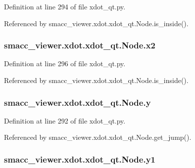 Definition at line 294 of file xdot\+\_\+qt.\+py.



Referenced by smacc\+\_\+viewer.\+xdot.\+xdot\+\_\+qt.\+Node.\+is\+\_\+inside().

\subsubsection[{\texorpdfstring{x2}{x2}}]{\setlength{\rightskip}{0pt plus 5cm}smacc\+\_\+viewer.\+xdot.\+xdot\+\_\+qt.\+Node.\+x2}\hypertarget{classsmacc__viewer_1_1xdot_1_1xdot__qt_1_1Node_a6db9655a45494d9daff50dfedb593db3}{}\label{classsmacc__viewer_1_1xdot_1_1xdot__qt_1_1Node_a6db9655a45494d9daff50dfedb593db3}


Definition at line 296 of file xdot\+\_\+qt.\+py.



Referenced by smacc\+\_\+viewer.\+xdot.\+xdot\+\_\+qt.\+Node.\+is\+\_\+inside().

\subsubsection[{\texorpdfstring{y}{y}}]{\setlength{\rightskip}{0pt plus 5cm}smacc\+\_\+viewer.\+xdot.\+xdot\+\_\+qt.\+Node.\+y}\hypertarget{classsmacc__viewer_1_1xdot_1_1xdot__qt_1_1Node_a61b07e1b4eebf60613eaed0a5e1204e4}{}\label{classsmacc__viewer_1_1xdot_1_1xdot__qt_1_1Node_a61b07e1b4eebf60613eaed0a5e1204e4}


Definition at line 292 of file xdot\+\_\+qt.\+py.



Referenced by smacc\+\_\+viewer.\+xdot.\+xdot\+\_\+qt.\+Node.\+get\+\_\+jump().

\subsubsection[{\texorpdfstring{y1}{y1}}]{\setlength{\rightskip}{0pt plus 5cm}smacc\+\_\+viewer.\+xdot.\+xdot\+\_\+qt.\+Node.\+y1}\hypertarget{classsmacc__viewer_1_1xdot_1_1xdot__qt_1_1Node_aaef3e410d013f329d8b7a6528ae77156}{}\label{classsmacc__viewer_1_1xdot_1_1xdot__qt_1_1Node_aaef3e410d013f329d8b7a6528ae77156}


